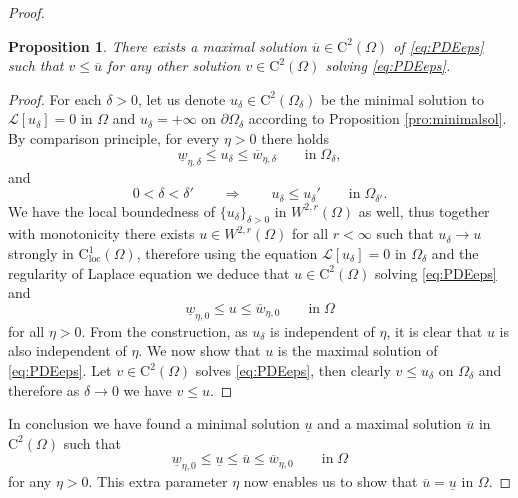 \documentclass[11pt,reqno]{amsart}
\numberwithin{figure}{section}
\theoremstyle{plain}
\newtheorem{prop}[thm]{Proposition}
\theoremstyle{remark}
\numberwithin{equation}{section}
\newcommand{\rmC}{\mathrm{C}}
\begin{document}
\begin{proof}
\begin{prop} There exists a maximal solution $\overline{u}\in \mathrm{C}^2(\Omega)$ of \eqref{eq:PDEeps} such that $v\leq \overline{u}$ for any other solution $v\in \mathrm{C}^2(\Omega)$ solving \eqref{eq:PDEeps}.
\end{prop}

\begin{proof} For each $\delta>0$, let us denote $u_\delta\in \mathrm{C}^2(\Omega_\delta)$ be the minimal solution to $\mathcal{L}[u_\delta] = 0$ in $\Omega$ and $u_\delta = +\infty$ on $\partial\Omega_\delta$ according to Proposition \ref{pro:minimalsol}. By comparison principle, for every $\eta>0$ there holds
\begin{equation*}
    \underline{w}_{\eta,\delta} \leq u_\delta \leq \overline{w}_{\eta,\delta} \qquad\text{in}\;\Omega_\delta,
\end{equation*}
and
\begin{equation*}
    0<\delta<\delta' \qquad \Longrightarrow\qquad u_\delta \leq u_\delta' \qquad\text{in}\;\Omega_{\delta'}.
\end{equation*}
We have the local boundedness of $\{u_\delta\}_{\delta>0}$ in $W^{2,r}(\Omega)$ as well, thus together with monotonicity there exists $u\in W^{2,r}(\Omega)$ for all $r<\infty$ such that $u_\delta\to u$ strongly in $\rmC^1_{\mathrm{loc}}(\Omega)$, therefore using the equation $\mathcal{L}[u_\delta] = 0$ in $\Omega_\delta$ and the regularity of Laplace equation we deduce that $u\in \mathrm{C}^2(\Omega)$ solving \eqref{eq:PDEeps} and 
\begin{equation*}
    \underline{w}_{\eta,0} \leq u\leq \overline{w}_{\eta,0} \qquad\text{in}\;\Omega
\end{equation*}
for all $\eta>0$. From the construction, as $u_\delta$ is independent of $\eta$, it is clear that $u$ is also independent of $\eta$. We now show that $u$ is the maximal solution of \eqref{eq:PDEeps}. Let $v\in\rmC^2(\Omega)$ solves \eqref{eq:PDEeps}, then clearly $v\leq u_\delta$ on $\Omega_\delta$ and therefore as $\delta \to 0$ we have $v\leq u$.
\end{proof}
\noindent In conclusion we have found a minimal solution $\underline{u}$ and a maximal solution $\overline{u}$ in $\rmC^2(\Omega)$ such that
\begin{equation}\label{e:chain}
    \underline{w}_{\eta,0} \leq \underline{u}\leq \overline{u}\leq \overline{w}_{\eta,0} \qquad\text{in}\;\Omega
\end{equation}
for any $\eta>0$. This extra parameter $\eta$ now enables us to show that $\overline{u} = \underline{u}$ in $\Omega$. 


\end{proof}
\end{document}
